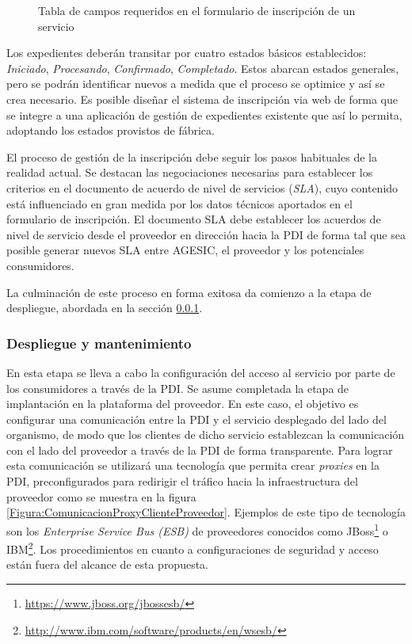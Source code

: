       \begin{figure}[h]
        \centering
        \caption{Tabla de campos requeridos en el formulario de inscripción de un servicio}
        \label{Figura:TablaDatosInscripcion}
      \end{figure}

      Los expedientes deberán transitar por cuatro estados básicos establecidos: \emph{Iniciado}, \emph{Procesando}, \emph{Confirmado}, \emph{Completado}. Estos abarcan estados generales, pero se podrán identificar nuevos a medida que el proceso se optimice y así se crea necesario. Es posible diseñar el sistema de inscripción via web de forma que se integre a una aplicación de gestión de expedientes existente que así lo permita, adoptando los estados provistos de fábrica.

      El proceso de gestión de la inscripción debe seguir los pasos habituales de la realidad actual. Se destacan las negociaciones necesarias para establecer los criterios en el documento de acuerdo de nivel de servicios (\emph{SLA}), cuyo contenido está influenciado en gran medida por los datos técnicos aportados en el formulario de inscripción. El documento SLA debe establecer los acuerdos de nivel de servicio desde el proveedor en dirección hacia la PDI de forma tal que sea posible generar nuevos SLA entre AGESIC, el proveedor y los potenciales consumidores.

      La culminación de este proceso en forma exitosa da comienzo a la etapa de despliegue, abordada en la sección \ref{Solucion:Gobernanza:CicloDeVidaAGESIC:Despliegue}.

    \subsubsection{Despliegue y mantenimiento}
      \label{Solucion:Gobernanza:CicloDeVidaAGESIC:Despliegue}

      En esta etapa se lleva a cabo la configuración del acceso al servicio por parte de los consumidores a través de la PDI. Se asume completada la etapa de implantación en la plataforma del proveedor. En este caso, el objetivo es configurar una comunicación entre la PDI y el servicio desplegado del lado del organismo, de modo que los clientes de dicho servicio establezcan la comunicación con el lado del proveedor a través de la PDI de forma transparente. Para lograr esta comunicación se utilizará una tecnología que permita crear \emph{proxies} en la PDI, preconfigurados para redirigir el tráfico hacia la infraestructura del proveedor como se muestra en la figura \ref{Figura:ComunicacionProxyClienteProveedor}. Ejemplos de este tipo de tecnología son los \emph{Enterprise Service Bus (ESB)} de proveedores conocidos como JBoss\footnote{\url{https://www.jboss.org/jbossesb/}} o IBM\footnote{\url{http://www.ibm.com/software/products/en/wsesb/}}. Los procedimientos en cuanto a configuraciones de seguridad y acceso están fuera del alcance de esta propuesta.

